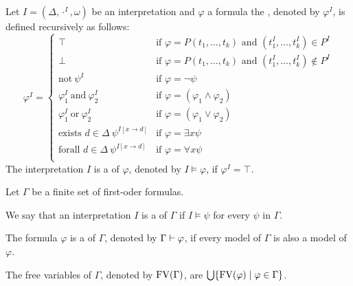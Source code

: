 \begin{definition}
Let $I=(\Delta,\cdot^I,\omega)$ be an interpretation and $\varphi$ a formula the , denoted by $\varphi^I$, is defined recursively as follows:
\[\varphi^I=
\begin{cases}
\top & \text{if $\varphi=P(t_1,\dots,t_k)$ and $(t^I_1,\dots,t^I_k)\in P^I$}\\
\bot & \text{if $\varphi=P(t_1,\dots,t_k)$ and $(t^I_1,\dots,t^I_k)\notin P^I$}\\
\text{not}~\psi^I & \text{if $\varphi=\neg\psi$}\\
\varphi^I_1~\text{and}~\varphi^I_2 & \text{if $\varphi=(\varphi_1\wedge\varphi_2)$}\\
\varphi^I_1~\text{or}~\varphi^I_2 & \text{if $\varphi=(\varphi_1\vee\varphi_2)$}\\
\text{exists $d\in\Delta$}~\psi^{I\left[x\to d\right]} & \text{if $\varphi=\exists x\psi$}\\
\text{forall $d\in\Delta$}~\psi^{I\left[x\to d\right]} & \text{if $\varphi=\forall x\psi$}\\
\end{cases}\]
The interpretation $I$ is a  of $\varphi$, denoted by $I\models\varphi$, if $\varphi^I=\top$.
\end{definition}
\begin{definition} %
Let $\Gamma$ be a finite set of first-oder formulas.
\begin{description}
\item We say that an interpretation $I$ is a  of $\Gamma$ if $I\models\psi$ for every $\psi$ in $\Gamma$.
\item The formula $\varphi$ is a  of $\Gamma$, denoted by $\Gamma\vdash\varphi$, if every model of $\Gamma$ is also a model of $\varphi$.
\item The free variables of $\Gamma$, denoted by $\text{FV}(\Gamma)$, are $\bigcup\{\text{FV}(\varphi)\mid \varphi\in \Gamma\}$.
\end{description}
\end{definition}